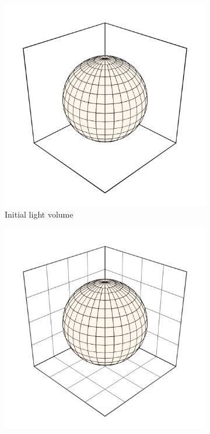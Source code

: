 \begin{figure}[t]
  \centering
  \begin{subfigure}[b]{.3\linewidth}
    \includegraphics[width=\textwidth]{./img/raw/hs-slt-algorithm/hs-slt-algorithm-1.png}%
    \caption{\footnotesize Initial light volume}%
    \label{fig:hs-p1a}%
  \end{subfigure}
  \begin{subfigure}[b]{.3\linewidth}
    \includegraphics[width=\textwidth]{./img/raw/hs-slt-algorithm/hs-slt-algorithm-2.png}%

\end{subfigure}
\end{figure}

